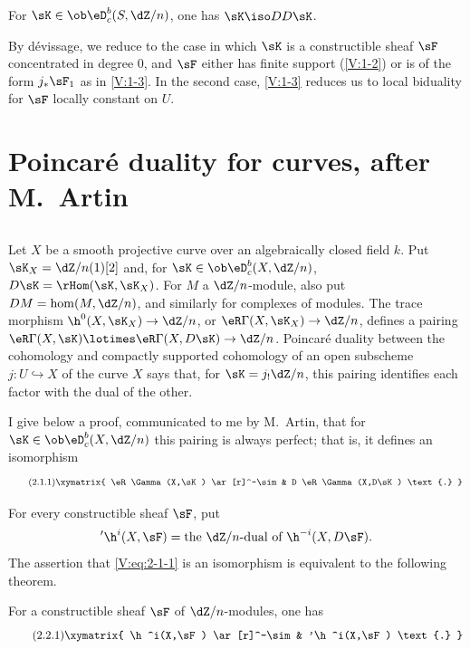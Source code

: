 \begin{theorem_}\label{V:1-4}
For $\sK\in \ob\eD_c^b(S,\dZ/n)$, one has $\sK\iso D D \sK$.
\end{theorem_}

By dévissage, we reduce to the case in which $\sK$ is a constructible sheaf
$\sF$ concentrated in degree $0$, and $\sF$ either has finite support
(\ref{V:1-2}) or is of the form $j_\ast\sF_1$ as in \ref{V:1-3}. In the
second case, \ref{V:1-3} reduces us to local biduality for $\sF$ locally
constant on $U$.


\section{Poincaré duality for curves, after M.\ Artin}\label{V:2}


\subsection{}\label{V:2-1}

Let $X$ be a smooth projective curve over an algebraically closed field $k$.
Put $\sK_X=\dZ/n(1)[2]$ and, for $\sK\in\ob \eD_c^b(X,\dZ/n)$,
$D\sK=\rHom(\sK,\sK_X)$. For $M$ a $\dZ/n$-module, also put
$D M = \hom(M,\dZ/n)$, and similarly for complexes of modules. The trace
morphism $\h^0(X,\sK_X) \to \dZ/n$, or
$\eR\Gamma(X,\sK_X)\to \dZ/n$, defines a pairing
$\eR\Gamma(X,\sK)\lotimes\eR\Gamma(X,D\sK) \to \dZ/n$. Poincaré duality
between the cohomology and compactly supported cohomology of an open
subscheme $j:U\hookrightarrow X$ of the curve $X$ says that, for
$\sK=j_!\dZ/n$, this pairing identifies each factor with the dual of the
other.

I give below a proof, communicated to me by M.\ Artin, that for
$\sK\in\ob\eD_c^b(X,\dZ/n)$ this pairing is always perfect; that is, it
defines an isomorphism
\begin{equation*}\tag{2.1.1}\label{V:eq:2-1-1}
\xymatrix{
  \eR\Gamma(X,\sK) \ar[r]^-\sim
    & D \eR\Gamma(X,D\sK) \text{.}
}
\end{equation*}

For every constructible sheaf $\sF$, put
\[
  '\h^i(X,\sF) = \text{the $\dZ/n$-dual of $\h^{-i}(X,D\sF)$.}
\]
The assertion that \eqref{V:eq:2-1-1} is an isomorphism is equivalent to the
following theorem.


\begin{theorem_}\label{V:2-2}
For a constructible sheaf $\sF$ of $\dZ/n$-modules, one has
\begin{equation*}\tag{2.2.1}\label{V:eq:2-2-1}
\xymatrix{
  \h^i(X,\sF) \ar[r]^-\sim
    & '\h^i(X,\sF) \text{.}
}
\end{equation*}
\end{theorem_}


